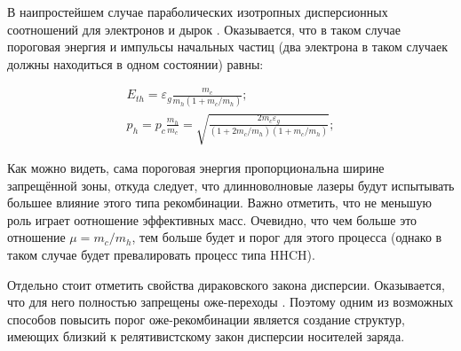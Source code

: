 \documentclass[../main.tex]{subfiles}
\begin{document}
    В наипростейшем случае параболических изотропных дисперсионных 
    соотношений для электронов и дырок \cite{AbakumovYassievich1997}. Оказывается,
    что в таком случае пороговая энергия и импульсы начальных частиц (два электрона
    в таком случаек должны находиться в одном состоянии) равны:

        \begin{equation}
            \begin{array}{l}
                E_{th} = \varepsilon_g \frac{m_c}{m_h ( 1 + m_c / m_h)};\\
                p_{h} = p_{c} \frac{m_h}{m_c} = \sqrt{\frac{2m_c \varepsilon_g}{(1+ 2m_c/m_h)(1+ m_c / m_h)}};
            \end{array}
        \end{equation}

    Как можно видеть, сама пороговая энергия пропорциональна ширине запрещённой зоны,
    откуда следует, что длинноволновые  лазеры будут испытывать большее влияние этого 
    типа рекомбинации. Важно отметить, что не меньшую роль играет оотношение эффективных
    масс. Очевидно, что чем больше это отношение $\mu = m_c / m_h$, тем больше будет и порог
    для этого процесса (однако в таком случае будет превалировать процесс типа HHCH).

    Отдельно стоит отметить свойства дираковского закона дисперсии. Оказывается, что 
    для него полностью запрещены оже-переходы \cite{Vasko:2006}. Поэтому одним из 
    возможных способов повысить порог оже-рекомбинации является создание структур, имеющих
    близкий к релятивистскому закон дисперсии носителей заряда.
\end{document}
